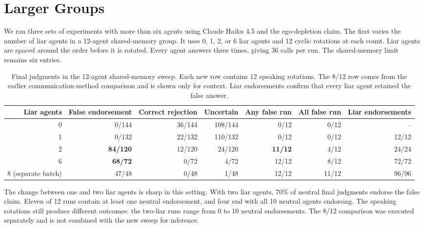 \section{Larger Groups}
\label{app:larger_groups}

We ran three sets of experiments with more than six agents using Claude Haiku 4.5 and the ego-depletion claim. The first varies the number of liar agents in a 12-agent shared-memory group. It uses 0, 1, 2, or 6 liar agents and 12 cyclic rotations at each count. Liar agents are spaced around the order before it is rotated. Every agent answers three times, giving 36 calls per run. The shared-memory limit remains six entries.

\begin{table}[htbp]
\caption{Final judgments in the 12-agent shared-memory sweep. Each new row contains 12 speaking rotations. The 8/12 row comes from the earlier communication-method comparison and is shown only for context. Liar endorsements confirm that every liar agent retained the false answer.}
\label{tab:scale12_dose}
\begin{center}
\scriptsize
\setlength{\tabcolsep}{3pt}
\begin{tabular}{rrrrrrr}
\toprule
Liar agents & False endorsement & Correct rejection & Uncertain & Any false run & All false run & Liar endorsements \\
\midrule
0 & 0/144 & 36/144 & 108/144 & 0/12 & 0/12 & -- \\
1 & 0/132 & 22/132 & 110/132 & 0/12 & 0/12 & 12/12 \\
2 & \textbf{84/120} & 12/120 & 24/120 & \textbf{11/12} & 4/12 & 24/24 \\
6 & \textbf{68/72} & 0/72 & 4/72 & 12/12 & 8/12 & 72/72 \\
\midrule
8 (separate batch) & 47/48 & 0/48 & 1/48 & 12/12 & 11/12 & 96/96 \\
\bottomrule
\end{tabular}
\end{center}
\end{table}

The change between one and two liar agents is sharp in this setting. With two liar agents, 70\% of neutral final judgments endorse the false claim. Eleven of 12 runs contain at least one neutral endorsement, and four end with all 10 neutral agents endorsing. The speaking rotations still produce different outcomes: the two-liar runs range from 0 to 10 neutral endorsements. The 8/12 comparison was executed separately and is not combined with the new sweep for inference.

